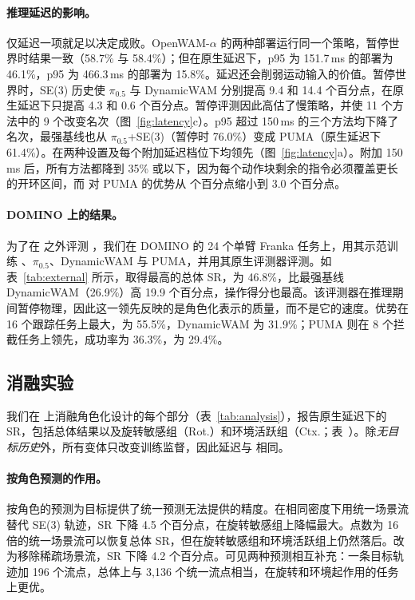 \paragraph{推理延迟的影响。}
仅延迟一项就足以决定成败。OpenWAM-$\alpha$ 的两种部署运行同一个策略，暂停世界时结果一致（58.7\% 与 58.4\%）；但在原生延迟下，p95 为 151.7\,ms 的部署为 46.1\%，p95 为 466.3\,ms 的部署为 15.8\%。延迟还会削弱运动输入的价值。暂停世界时，SE(3) 历史使 $\pi_{0.5}$ 与 DynamicWAM 分别提高 9.4 和 14.4 个百分点，在原生延迟下只提高 4.3 和 0.6 个百分点。暂停评测因此高估了慢策略，并使 11 个方法中的 9 个改变名次（图~\ref{fig:latency}c）。p95 超过 150\,ms 的三个方法均下降了名次，最强基线也从 $\pi_{0.5}$+SE(3)（暂停时 76.0\%）变成 PUMA（原生延迟下 61.4\%）。\ours 在两种设置及每个附加延迟档位下均领先（图~\ref{fig:latency}a）。附加 150\,ms 后，所有方法都降到 35\% 或以下，因为每个动作块剩余的指令必须覆盖更长的开环区间，而 \ours 对 PUMA 的优势从 \nativeLead{} 个百分点缩小到 3.0 个百分点。



\paragraph{DOMINO 上的结果。}
为了在 \bench 之外评测 \ours，我们在 DOMINO \cite{domino} 的 24 个单臂 Franka 任务上，用其示范训练 \ours、$\pi_{0.5}$、DynamicWAM 与 PUMA，并用其原生评测器评测。如表~\ref{tab:external} 所示，\ours 取得最高的总体 SR，为 46.8\%，比最强基线 DynamicWAM（26.9\%）高 19.9 个百分点，操作得分也最高。该评测器在推理期间暂停物理，因此这一领先反映的是角色化表示的质量，而不是它的速度。优势在 16 个跟踪任务上最大，\ours 为 55.5\%，DynamicWAM 为 31.9\%；PUMA 则在 8 个拦截任务上领先，成功率为 36.3\%，\ours 为 29.4\%。



\subsection{消融实验}
\label{sec:principles}
我们在 \bench 上消融角色化设计的每个部分（表~\ref{tab:analysis}），报告原生延迟下的 SR，包括总体结果以及旋转敏感组（Rot.）和环境活跃组（Ctx.；表~）。除\emph{无目标历史}外，所有变体只改变训练监督，因此延迟与 \ours 相同。



\paragraph{按角色预测的作用。}
按角色的预测为目标提供了统一预测无法提供的精度。在相同密度下用统一场景流替代 SE(3) 轨迹，SR 下降 4.5 个百分点，在旋转敏感组上降幅最大。点数为 16 倍的统一场景流可以恢复总体 SR，但在旋转敏感组和环境活跃组上仍然落后。改为移除稀疏场景流，SR 下降 4.2 个百分点。可见两种预测相互补充：一条目标轨迹加 196 个流点，总体上与 3{,}136 个统一流点相当，在旋转和环境起作用的任务上更优。


